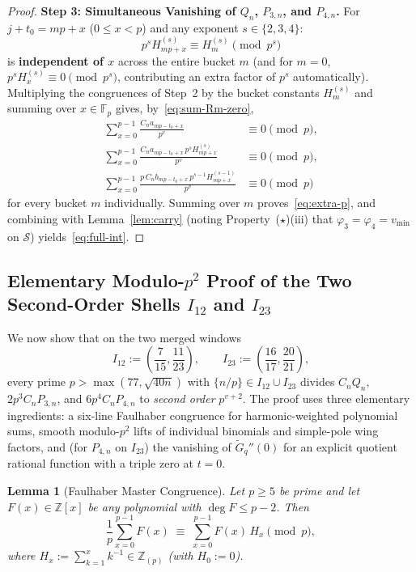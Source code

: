 \documentclass[11pt,reqno]{amsart}
\newtheorem{lemma}[theorem]{Lemma}
\theoremstyle{definition}
\theoremstyle{remark}
\newcommand{\ZZ}{\mathbb{Z}}
\newcommand{\FF}{\mathbb{F}}
\begin{document}
\begin{proof}
\medskip
\noindent\textbf{Step 3: Simultaneous Vanishing of $Q_n$, $P_{3,n}$, and $P_{4,n}$.}
For $j + t_0 = m p + x$ ($0 \le x < p$) and any exponent $s \in \{2, 3, 4\}$:
\[
  p^s H_{mp + x}^{(s)} \equiv H_m^{(s)} \pmod{p^s}
\]
is \textbf{independent of $x$} across the entire bucket $m$ (and for $m = 0$, $p^s H_x^{(s)} \equiv 0 \pmod{p^s}$, contributing an extra factor of $p^s$ automatically). Multiplying the congruences of Step~2 by the bucket constants $H_m^{(s)}$ and summing over $x \in \FF_p$ gives, by~\eqref{eq:sum-Rm-zero},
\begin{align*}
  \sum_{x=0}^{p-1} \frac{C_n a_{mp-t_0+x}}{p^v} &\equiv 0 \pmod p, \\
  \sum_{x=0}^{p-1} \frac{C_n a_{mp-t_0+x}\, p^s H_{mp+x}^{(s)}}{p^v} &\equiv 0 \pmod p, \\
  \sum_{x=0}^{p-1} \frac{p\, C_n b_{mp-t_0+x}\, p^{s-1} H_{mp+x}^{(s-1)}}{p^v} &\equiv 0 \pmod p
\end{align*}
for every bucket $m$ individually. Summing over $m$ proves~\eqref{eq:extra-p}, and combining with Lemma~\ref{lem:carry} (noting Property~($\star$)(iii) that $\varphi_3 = \varphi_4 = v_{\min}$ on $\mathcal{S}$) yields~\eqref{eq:full-int}.
\end{proof}

\subsection{Elementary Modulo-\texorpdfstring{$p^2$}{p2} Proof of the Two Second-Order Shells \texorpdfstring{$I_{12}$ and $I_{23}$}{I\_12 and I\_23}}
\label{sec:second-order}

We now show that on the two merged windows
\[
  I_{12} := \left(\frac{7}{15}, \frac{11}{23}\right),
  \qquad
  I_{23} := \left(\frac{16}{17}, \frac{20}{21}\right),
\]
every prime $p > \max(77, \sqrt{40n})$ with $\{n/p\} \in I_{12} \cup I_{23}$ divides $C_n Q_n$, $2 p^3 C_n P_{3,n}$, and $6 p^4 C_n P_{4,n}$ to \emph{second order} $p^{v + 2}$. The proof uses three elementary ingredients: a six-line Faulhaber congruence for harmonic-weighted polynomial sums, smooth modulo-$p^2$ lifts of individual binomials and simple-pole wing factors, and (for $P_{4,n}$ on $I_{23}$) the vanishing of $\widetilde{G}_q''(0)$ for an explicit quotient rational function with a triple zero at $t = 0$.

\begin{lemma}[Faulhaber Master Congruence]
\label{lem:master-faulhaber}
Let $p \ge 5$ be prime and let $F(x) \in \ZZ[x]$ be any polynomial with $\deg F \le p - 2$. Then
\begin{equation}
\label{eq:master-faulhaber}
  \frac{1}{p} \sum_{x = 0}^{p - 1} F(x)
  \;\equiv\; \sum_{x = 0}^{p - 1} F(x)\, H_x \pmod p,
\end{equation}
where $H_x := \sum_{k=1}^{x} k^{-1} \in \ZZ_{(p)}$ (with $H_0 := 0$).
\end{lemma}
\end{document}
